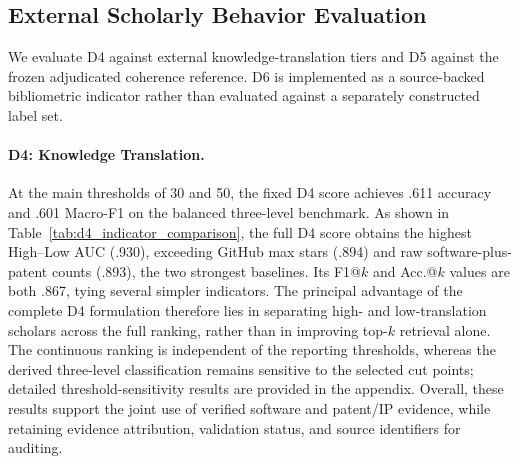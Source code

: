 \documentclass[letterpaper]{article} %
\begin{document}
\subsection{External Scholarly Behavior Evaluation}
\label{sec:external_evaluation}

We evaluate D4 against external knowledge-translation tiers and D5 against the frozen adjudicated coherence reference. D6 is implemented as a source-backed bibliometric indicator rather than evaluated against a 
separately constructed label set.

\paragraph{D4: Knowledge Translation.}
At the main thresholds of 30 and 50, the fixed D4 score achieves .611 accuracy
and .601 Macro-F1 on the balanced three-level benchmark. As shown in
Table~\ref{tab:d4_indicator_comparison}, the full D4 score obtains the highest
High--Low AUC (.930), exceeding GitHub max stars (.894) and raw
software-plus-patent counts (.893), the two strongest baselines. Its F1@$k$ and
Acc.@$k$ values are both .867, tying several simpler indicators. The principal
advantage of the complete D4 formulation therefore lies in separating high- and
low-translation scholars across the full ranking, rather than in improving
top-$k$ retrieval alone. The continuous ranking is independent of the reporting
thresholds, whereas the derived three-level classification remains sensitive to
the selected cut points; detailed threshold-sensitivity results are provided in
the appendix. Overall, these results support the joint use of verified software
and patent/IP evidence, while retaining evidence attribution, validation status,
and source identifiers for auditing.
\end{document}
